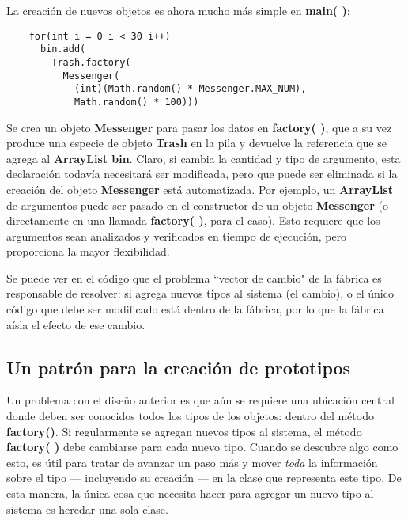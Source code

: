 La creación de nuevos objetos es ahora mucho más simple en \textbf{main( )}:    \newline

\begin{lstlisting} 
    for(int i = 0 i < 30 i++) 
      bin.add( 
        Trash.factory( 
          Messenger( 
            (int)(Math.random() * Messenger.MAX_NUM), 
            Math.random() * 100))) 
\end{lstlisting}

Se crea un objeto \textbf{Messenger} para pasar los datos en \textbf{factory( )},
que a su vez produce una especie de objeto \textbf{Trash} en la pila y devuelve la referencia que se agrega al \textbf{ArrayList bin}. Claro, si cambia la cantidad y tipo de argumento, esta declaración todavía necesitará ser modificada, pero que puede ser eliminada si la creación del objeto \textbf{Messenger} está automatizada. Por ejemplo, un \textbf{ArrayList} de argumentos puede ser pasado en el constructor de un objeto \textbf{Messenger} (o directamente en una llamada \textbf{factory( )}, para el caso). Esto requiere que los argumentos sean analizados y verificados en tiempo de ejecución, pero proporciona la mayor flexibilidad.    \newline

Se puede ver en el código que el problema “vector de cambio" de la fábrica es responsable de resolver: si agrega nuevos tipos al sistema (el cambio), o el único código que debe ser modificado está dentro de la fábrica, por lo que la fábrica aísla el efecto de ese cambio. \newline


\subsection*{Un patrón para la creación de prototipos}
\label{subsec:upplcdp}

Un problema con el diseño anterior es que aún se requiere una ubicación central donde deben ser conocidos todos los tipos de los objetos: dentro del método \textbf{factory()}. Si regularmente se agregan nuevos tipos al sistema, el método \textbf{factory( )} debe cambiarse para cada nuevo tipo. Cuando se descubre algo como esto, es útil para tratar de avanzar un paso más y mover \textit{toda} la información sobre el tipo — incluyendo su creación — en la clase que representa este tipo. De esta manera, la única cosa que necesita hacer para agregar un nuevo tipo al sistema es heredar una sola clase.   \newline

